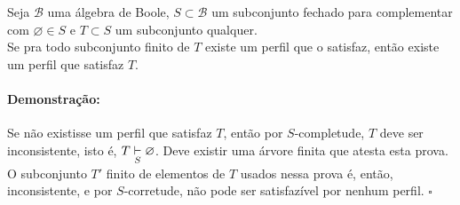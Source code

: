 \documentclass[11pt]{article}
\newcommand{\pulinho}{\vspace{.5cm}}
\theoremstyle{definition}
\theoremstyle{definition}
\theoremstyle{definition}
\theoremstyle{definition}
\newtheorem*{prop*}{Proposição}
\newenvironment{proposicao*}{
\definecolor{shadecolor}{HTML}{FFDBDF}
\begin{shaded}
\begin{prop*}
}
{
\end{prop*}
\end{shaded}
}
\theoremstyle{definition}
\theoremstyle{definition}
\theoremstyle{definition}
\theoremstyle{definition}
\theoremstyle{definition}
\theoremstyle{definition}
\theoremstyle{definition}
\theoremstyle{definition}
\newenvironment{prova}{\paragraph{Demonstração:}}{\hfill$\square$ 
\pulinho
}
\theoremstyle{definition}
\theoremstyle{definition}
\begin{document}



\begin{proposicao*}[$S$-compacidade]
Seja $\mathcal{B}$ uma álgebra de Boole, $S \subset \mathcal{B}$ um subconjunto fechado para complementar com $\varnothing \in S$ e $T \subset S$ um subconjunto qualquer.\\

Se pra todo subconjunto finito de $T$ existe um perfil que o satisfaz, então existe um perfil que satisfaz $T$.

\end{proposicao*}

\begin{prova}
  Se não existisse um perfil que satisfaz $T$, então por $S$-completude, $T$ deve ser inconsistente, isto é, $T \underset{S}{\vdash} \varnothing$. Deve existir uma árvore finita que atesta esta prova. O subconjunto $T'$ finito de elementos de $T$ usados nessa prova é, então, inconsistente, e por $S$-corretude, não pode ser satisfazível por nenhum perfil.
\end{prova}
\end{document}
